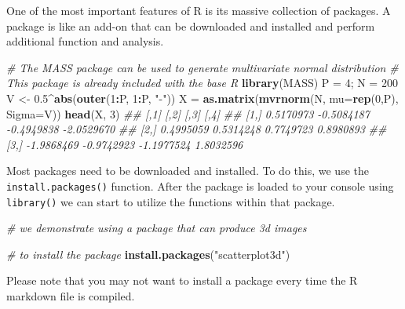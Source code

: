 \documentclass[
]{article}
\newenvironment{Shaded}{\begin{snugshade}}{\end{snugshade}}
\newcommand{\CommentTok}[1]{\textcolor[rgb]{0.56,0.35,0.01}{\textit{#1}}}
\newcommand{\DataTypeTok}[1]{\textcolor[rgb]{0.13,0.29,0.53}{#1}}
\newcommand{\DecValTok}[1]{\textcolor[rgb]{0.00,0.00,0.81}{#1}}
\newcommand{\FloatTok}[1]{\textcolor[rgb]{0.00,0.00,0.81}{#1}}
\newcommand{\KeywordTok}[1]{\textcolor[rgb]{0.13,0.29,0.53}{\textbf{#1}}}
\newcommand{\NormalTok}[1]{#1}
\newcommand{\OperatorTok}[1]{\textcolor[rgb]{0.81,0.36,0.00}{\textbf{#1}}}
\newcommand{\StringTok}[1]{\textcolor[rgb]{0.31,0.60,0.02}{#1}}
\begin{document}
One of the most important features of R is its massive collection of
packages. A package is like an add-on that can be downloaded and
installed and perform additional function and analysis.

\begin{Shaded}
\begin{Highlighting}[]

    \CommentTok{# The MASS package can be used to generate multivariate normal distribution }
    \CommentTok{# This package is already included with the base R}
    \KeywordTok{library}\NormalTok{(MASS)}
\NormalTok{    P =}\StringTok{ }\DecValTok{4}\NormalTok{; N =}\StringTok{ }\DecValTok{200}
\NormalTok{    V <-}\StringTok{ }\FloatTok{0.5}\OperatorTok{^}\KeywordTok{abs}\NormalTok{(}\KeywordTok{outer}\NormalTok{(}\DecValTok{1}\OperatorTok{:}\NormalTok{P, }\DecValTok{1}\OperatorTok{:}\NormalTok{P, }\StringTok{"-"}\NormalTok{))}
\NormalTok{    X =}\StringTok{ }\KeywordTok{as.matrix}\NormalTok{(}\KeywordTok{mvrnorm}\NormalTok{(N, }\DataTypeTok{mu=}\KeywordTok{rep}\NormalTok{(}\DecValTok{0}\NormalTok{,P), }\DataTypeTok{Sigma=}\NormalTok{V))}
    \KeywordTok{head}\NormalTok{(X, }\DecValTok{3}\NormalTok{)}
\CommentTok{##            [,1]       [,2]       [,3]       [,4]}
\CommentTok{## [1,]  0.5170973 -0.5084187 -0.4949838 -2.0529670}
\CommentTok{## [2,]  0.4995059  0.5314248  0.7749723  0.8980893}
\CommentTok{## [3,] -1.9868469 -0.9742923 -1.1977524  1.8032596}
\end{Highlighting}
\end{Shaded}

Most packages need to be downloaded and installed. To do this, we use
the \texttt{install.packages()} function. After the package is loaded to
your console using \texttt{library()} we can start to utilize the
functions within that package.

\begin{Shaded}
\begin{Highlighting}[]
    \CommentTok{# we demonstrate using a package that can produce 3d images}

    \CommentTok{# to install the package}
    \KeywordTok{install.packages}\NormalTok{(}\StringTok{"scatterplot3d"}\NormalTok{)}
\end{Highlighting}
\end{Shaded}

Please note that you may not want to install a package every time the R
markdown file is compiled.
\end{document}
